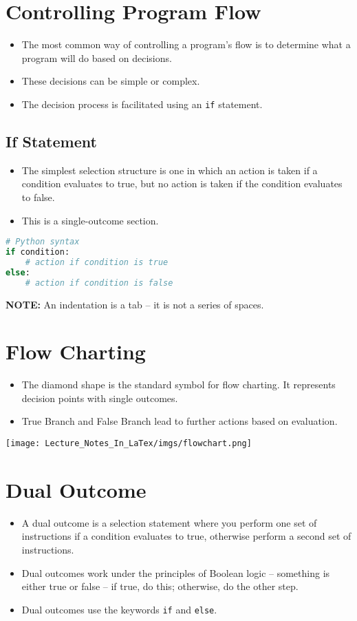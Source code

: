 \documentclass{article}
\begin{document}
\section{Controlling Program Flow}
\begin{itemize}
    \item The most common way of controlling a program's flow is to determine what a program will do based on decisions.
    \item These decisions can be simple or complex.
    \item The decision process is facilitated using an \texttt{if} statement.
\end{itemize}

\subsection{If Statement}
\begin{itemize}
    \item The simplest selection structure is one in which an action is taken if a condition evaluates to true, but no action is taken if the condition evaluates to false.
    \item This is a single-outcome section.
\end{itemize}

\begin{lstlisting}[language=Python]
# Python syntax
if condition:
    # action if condition is true
else:
    # action if condition is false
\end{lstlisting}
\textbf{NOTE:} An indentation is a tab – it is not a series of spaces.

\section{Flow Charting}
\begin{itemize}
    \item The diamond shape is the standard symbol for flow charting. It represents decision points with single outcomes.
    \item True Branch and False Branch lead to further actions based on evaluation.
\end{itemize}
\texttt{[image: Lecture\_Notes\_In\_LaTex/imgs/flowchart.png]}
\section{Dual Outcome}
\begin{itemize}
    \item A dual outcome is a selection statement where you perform one set of instructions if a condition evaluates to true, otherwise perform a second set of instructions.
    \item Dual outcomes work under the principles of Boolean logic – something is either true or false – if true, do this; otherwise, do the other step.
    \item Dual outcomes use the keywords \texttt{if} and \texttt{else}.
\end{itemize}
\end{document}
